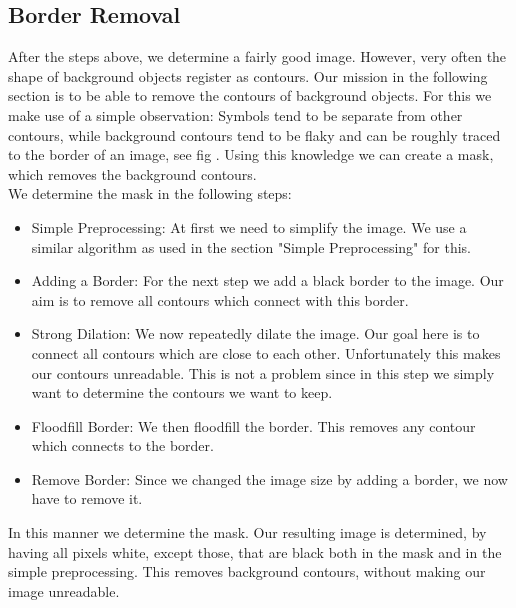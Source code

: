 \documentclass[12pt]{article}
\begin{document}
	\subsection{Border Removal}%
		After the steps above, we determine a fairly good image.
		However, very often the shape of background objects register as contours.
		Our mission in the following section is to be able to remove the contours of background objects.
		For this we make use of a simple observation: Symbols tend to be separate from other contours, while background contours tend to be flaky and can be roughly traced to the border of an image, see fig .%
		Using this knowledge we can create a mask, which removes the background contours.\\
		We determine the mask in the following steps:
		\begin{itemize}
			\item Simple Preprocessing: At first we need to simplify the image. We use a similar algorithm as used in the section "Simple Preprocessing" for this.
			\item Adding a Border: For the next step we add a black border to the image. Our aim is to remove all contours which connect with this border.
			\item Strong Dilation: We now repeatedly dilate the image. Our goal here is to connect all contours which are close to each other.
			Unfortunately this makes our contours unreadable.
			This is not a problem since in this step we simply want to determine the contours we want to keep.
			\item Floodfill Border: We then floodfill the border.
			This removes any contour which connects to the border. 
			\item Remove Border: Since we changed the image size by adding a border, we now have to remove it.
		\end{itemize}
		In this manner we determine the mask.
		Our resulting image is determined, by having all pixels white, except those, that are black both in the mask and in the simple preprocessing.
		This removes background contours, without making our image unreadable.
	
\end{document}
